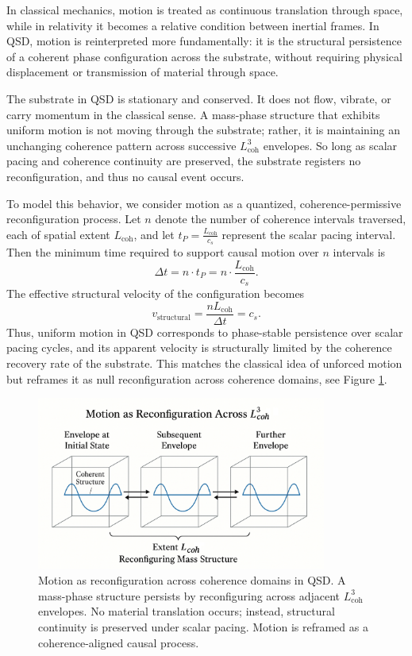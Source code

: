 \documentclass[entropy,article,submit,pdftex,oneauthor]{Definitions/mdpi}
\begin{document}
In classical mechanics, motion is treated as continuous translation through space, while in relativity it becomes a relative condition between inertial frames. In QSD, motion is reinterpreted more fundamentally: it is the structural persistence of a coherent phase configuration across the substrate, without requiring physical displacement or transmission of material through space.

The substrate in QSD is stationary and conserved. It does not flow, vibrate, or carry momentum in the classical sense. A mass-phase structure that exhibits uniform motion is not moving through the substrate; rather, it is maintaining an unchanging coherence pattern across successive \texorpdfstring{\( L_{\text{coh}}^3 \)}{Lcoh\^{}3} envelopes. So long as scalar pacing and coherence continuity are preserved, the substrate registers no reconfiguration, and thus no causal event occurs.

To model this behavior, we consider motion as a quantized, coherence-permissive reconfiguration process. Let \( n \) denote the number of coherence intervals traversed, each of spatial extent \( L_{\text{coh}} \), and let \( t_P = \frac{L_{\text{coh}}}{c_s} \) represent the scalar pacing interval. Then the minimum time required to support causal motion over \( n \) intervals is
\[
\Delta t = n \cdot t_P = n \cdot \frac{L_{\text{coh}}}{c_s}.
\]
The effective structural velocity of the configuration becomes
\[
v_{\text{structural}} = \frac{n L_{\text{coh}}}{\Delta t} = c_s.
\]
Thus, uniform motion in QSD corresponds to phase-stable persistence over scalar pacing cycles, and its apparent velocity is structurally limited by the coherence recovery rate of the substrate. This matches the classical idea of unforced motion but reframes it as null reconfiguration across coherence domains, see Figure \ref{fig:motion}.

\begin{figure}[htbp]
\centering
\includegraphics[width=0.85\textwidth]{figures/motion.pdf}
\caption{Motion as reconfiguration across coherence domains in QSD. A mass-phase structure persists by reconfiguring across adjacent \( L_{\text{coh}}^3 \) envelopes. No material translation occurs; instead, structural continuity is preserved under scalar pacing. Motion is reframed as a coherence-aligned causal process.}
\label{fig:motion}
\end{figure}
\end{document}
